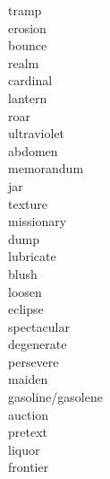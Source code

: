\documentclass[a4paper, 11pt]{ctexart}
\begin{document}
\begin{multicols*}{3}
\begin{description}
\item[tramp]

\item[erosion]

\item[bounce]

\item[realm]

\item[cardinal]

\item[lantern]

\item[roar]

\item[ultraviolet]

\item[abdomen]

\item[memorandum]

\item[jar]

\item[texture]

\item[missionary]

\item[dump]

\item[lubricate]

\item[blush]

\item[loosen]

\item[eclipse]

\item[spectacular]

\item[degenerate]

\item[persevere]

\item[maiden]

\item[gasoline/gasolene]

\item[auction]

\item[pretext]

\item[liquor]

\item[frontier]


\end{description}
\end{multicols*}
\end{document}
